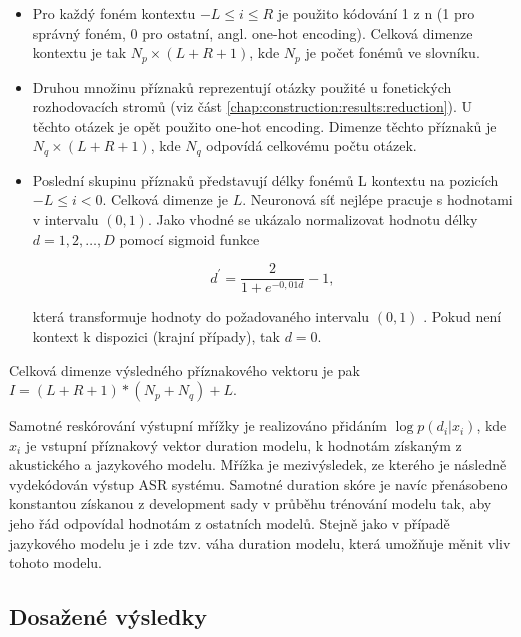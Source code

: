\begin{itemize}
  \item Pro každý foném kontextu $-L \leq i \leq R$ je použito kódování 1 z n (1 pro správný foném, 0 pro ostatní, angl. one-hot encoding). Celková dimenze kontextu je tak $N_{p} \times \left(L + R + 1\right)$, kde $N_{p}$ je počet fonémů ve slovníku.
  \item Druhou množinu příznaků reprezentují otázky použité u fonetických rozhodovacích stromů (viz část \ref{chap:construction:results:reduction}). U těchto otázek je opět použito one-hot encoding. Dimenze těchto příznaků je $N_{q} \times \left(L + R + 1\right)$, kde $N_{q}$ odpovídá celkovému počtu otázek.
  \item Poslední skupinu příznaků představují délky fonémů L kontextu na pozicích $-L \leq i < 0$. Celková dimenze je $L$. Neuronová síť nejlépe pracuje s hodnotami v intervalu $\left(0, 1\right)$. Jako vhodné se ukázalo normalizovat hodnotu délky $d=1, 2, \dots, D$ pomocí sigmoid funkce

  \begin{equation}
    d^{\prime} = \frac{2}{1 + e^{-0,01d}} - 1,
    \label{eq:realisation:durationmodels:nn:normalization}
  \end{equation}

  \noindent která transformuje hodnoty do požadovaného intervalu $\left(0, 1\right)$ \cite{Alumae2014}. Pokud není kontext k dispozici (krajní případy), tak $d = 0$.
\end{itemize}

\noindent Celková dimenze výsledného příznakového vektoru je pak $I = \left(L + R + 1\right) \ast \left(N_{p} + N_{q}\right) + L$.

Samotné reskórování výstupní mřížky je realizováno přidáním $\log p\left(d_{i}| x_{i}\right)$, kde $x_{i}$ je vstupní příznakový vektor duration modelu, k hodnotám získaným z akustického a jazykového modelu. Mřížka je mezivýsledek, ze kterého je následně vydekódován výstup ASR systému. Samotné duration skóre je navíc přenásobeno konstantou získanou z development sady v průběhu trénování modelu tak, aby jeho řád odpovídal hodnotám z ostatních modelů. \cite{Hadian2017} Stejně jako v případě jazykového modelu je i zde tzv. váha duration modelu, která umožňuje měnit vliv tohoto modelu.

\subsection{Dosažené výsledky}
\label{chap:realisation:durationmodels:nn:softmax}

